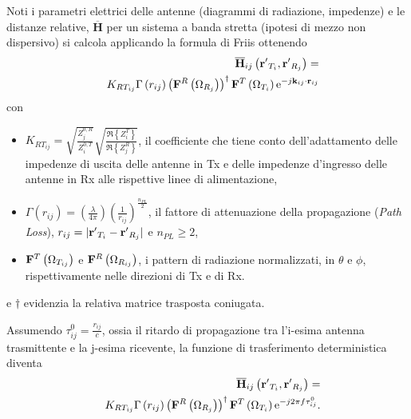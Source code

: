\documentclass[technote]{IEEEtran}
\newcommand{\mat}[1]{\mathbf{#1}}
\newcommand{\hilight}[1]{\colorbox{yellow}{#1}}
\begin{document}
Noti i parametri elettrici delle antenne (diagrammi di radiazione, impedenze) e le distanze relative, $\overline{\mat{H}}$ per un sistema a banda stretta (ipotesi di mezzo non dispersivo) si calcola applicando la formula di Friis ottenendo%
\begin{eqnarray} 
& & \hspace{-1cm} {\overline {\bf{H}} _{ij}}\left( {{{{\bf{r'}}}_{{T_i}}},{{{\bf{r'}}}_{{R_j}}}} \right) = \nonumber \\ 
& & \hspace{0cm} {K_{R{T_{ij}}}}\Gamma \left( {{r_{ij}}} \right){\left( {{{\bf{F}}^R}\left( {{\Omega _{{R_j}}}} \right)} \right)^\dagger}\,{{\bf{F}}^T}\left( {{\Omega _{{T_i}}}} \right){{\rm{e}}^{ - j{{\bf{k}}_{ij}} \cdot {{\bf{r}}_{ij}}}} \nonumber
\end{eqnarray} con 
\begin{itemize}
\item ${ K_{R{T_{ij}}}} = \sqrt {\frac{{Z_j^{0,R}}}{{Z_i^{0,T}}}} \sqrt {\frac{{\Re \left\{ {Z_i^T} \right\}}}{{\Re \left\{ {Z_j^R} \right\}}}} $, il coefficiente che tiene conto dell'adattamento delle impedenze di uscita delle antenne in Tx e delle impedenze d'ingresso delle antenne in Rx alle rispettive linee di alimentazione,
\item $\Gamma \left( {{r_{ij}}} \right) = \left( {\frac{\lambda }{{4\pi }}} \right){\left( {\frac{1}{{{r_{ij}}}}} \right)^{\frac{{{n_{PL}}}}{2}}}$, il fattore di attenuazione della propagazione (\textit{Path Loss}), ${r_{ij}} = |{{\bf{r'}}_{{T_i}}} - {{\bf{r'}}_{{R_j}}}|$ e ${n_{PL}} \ge 2$,
\item ${{\bf{F}}^T}\left( {{\Omega _{{T_{ij}}}}} \right)$ e ${{\bf{F}}^R}\left( {{\Omega _{{R_{ij}}}}} \right)$, i pattern di radiazione normalizzati, in $\theta$ e $\phi$, rispettivamente nelle direzioni di Tx e di Rx.
\end{itemize} e $\dagger$ evidenzia la relativa matrice trasposta coniugata.
\par Assumendo $\tau _{ij}^0 = \frac{{{r_{ij}}}}{c}$, ossia il ritardo di propagazione tra l'i-esima antenna trasmittente e la j-esima ricevente, la funzione di trasferimento deterministica diventa
\begin{eqnarray} 
& & \hspace{-1cm} {\overline {\bf{H}} _{ij}}\left( {{{{\bf{r'}}}_{{T_i}}},{{{\bf{r'}}}_{{R_j}}}} \right) = \nonumber \\
& & \hspace{0cm} {K_{R{T_{ij}}}}\Gamma \left( {{r_{ij}}} \right){\left( {{{\bf{F}}^R}\left( {{\Omega _{{R_j}}}} \right)} \right)^\dagger}\,{{\bf{F}}^T}\left( {{\Omega _{{T_i}}}} \right){{\rm{e}}^{ - j2\pi f\tau _{ij}^0}}. \nonumber
\end{eqnarray}
\end{document}

